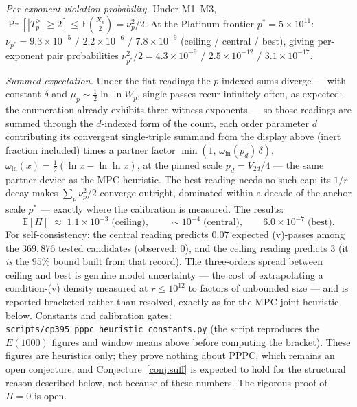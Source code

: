\documentclass[11pt]{amsart}
\theoremstyle{plain}
\theoremstyle{definition}
\theoremstyle{remark}
\numberwithin{equation}{section}
\newcommand{\Prob}{\operatorname{Pr}}
\begin{document}
\emph{Per-exponent violation probability.} Under M1--M3,
$\Prob[|T_p^{>}| \geq 2] \leq \mathbb{E}\binom{X_p}{2} = \nu_p^2/2$. At
the Platinum frontier $p^\ast = 5 \times 10^{11}$:
$\nu_{p^\ast} = 9.3 \times 10^{-5}$ $/$ $2.2 \times 10^{-6}$ $/$
$7.8 \times 10^{-9}$ (ceiling / central / best), giving per-exponent
pair probabilities $\nu_{p^\ast}^2/2 = 4.3 \times 10^{-9}$ $/$
$2.5 \times 10^{-12}$ $/$ $3.1 \times 10^{-17}$.

\emph{Summed expectation.} Under the flat readings the $p$-indexed sums
diverge --- with constant $\delta$ and $\mu_p \sim \tfrac12 \ln\ln W_p$,
single passes recur infinitely often, as expected: the enumeration
already exhibits three witness exponents --- so those readings are
summed through the $d$-indexed form of the count, each order parameter
$d$ contributing its convergent single-triple summand from the display
above (inert fraction included) times a partner factor
$\min(1,\, \omega_{\mathrm{in}}(\bar p_d)\, \delta)$,
$\omega_{\mathrm{in}}(x) = \tfrac12(\ln x - \ln\ln x)$, at the pinned
scale $\bar p_d = V_{2 d}/4$ --- the same partner device as the MPC
heuristic. The best reading needs no such cap: its $1/r$ decay makes
$\sum_p \nu_p^2/2$ converge outright, dominated within a decade of the
anchor scale $p^\ast$ --- exactly where the calibration is measured. The
results:
\[
  \mathbb{E}[\Pi] \;\approx\;
  1.1 \times 10^{-3} \;\text{(ceiling)}, \qquad
  \sim 10^{-4} \;\text{(central)}, \qquad
  6.0 \times 10^{-7} \;\text{(best)}.
\]
For self-consistency: the central reading predicts $0.07$ expected
(v)-passes among the $369{,}876$ tested candidates (observed: $0$), and
the ceiling reading predicts $3$ (it \emph{is} the $95\%$ bound built
from that record).
The three-orders spread between ceiling and best is genuine model
uncertainty --- the cost of extrapolating a condition-(v) density
measured at $r \leq 10^{12}$ to factors of unbounded size --- and is
reported bracketed rather than resolved, exactly as for the MPC joint
heuristic below. Constants and calibration gates:
\texttt{scripts/cp395\_pppc\_heuristic\_constants.py} (the script
reproduces the $E(1000)$ figures and window means above before computing
the bracket). These figures are heuristics only; they prove nothing
about PPPC, which remains an open conjecture, and
Conjecture~\ref{conj:suff} is expected to hold for the structural reason
described below, not because of these numbers. The rigorous proof of
$\Pi = 0$ is open.
\end{document}
